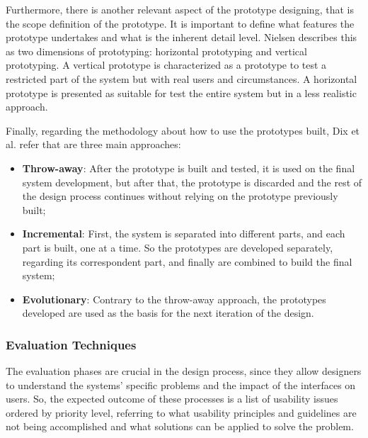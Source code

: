 Furthermore, there is another relevant aspect of the prototype designing, that is the scope definition of the prototype. It is important to define what features the prototype undertakes and what is the inherent detail level. Nielsen \cite{usabilityEngineering} describes this as two dimensions of prototyping: horizontal prototyping and vertical prototyping. %
A vertical prototype is characterized as a prototype to test a restricted part of the system but with real users and circumstances. A horizontal prototype is presented as suitable for test the entire system but in a less realistic approach.


Finally, regarding the methodology about how to use the prototypes built, Dix et al. \cite{humanComputerInteraction} refer that are three main approaches:

\begin{itemize}
	\item \textbf{Throw-away}: After the prototype is built and tested, it is used on the final system development, but after that, the prototype is discarded and the rest of the design process continues without relying on the prototype previously built;
	\item \textbf{Incremental}: First, the system is separated into different parts, and each part is built, one at a time. So the prototypes are developed separately, regarding its correspondent part, and finally are combined to build the final system;
	\item \textbf{Evolutionary}: Contrary to the throw-away approach, the prototypes developed are used as the basis for the next iteration of the design.
\end{itemize}





\subsubsection{Evaluation Techniques}
\label{subsubsec:user_and_task_analysis}
The evaluation phases are crucial in the design process, since they allow designers to understand the systems' specific problems and the impact of the interfaces on users. So, the expected outcome of these processes is a list of usability issues ordered by priority level, referring to what usability principles and guidelines are not being accomplished and what solutions can be applied to solve the problem. \cite{usabilityEngineering}  

